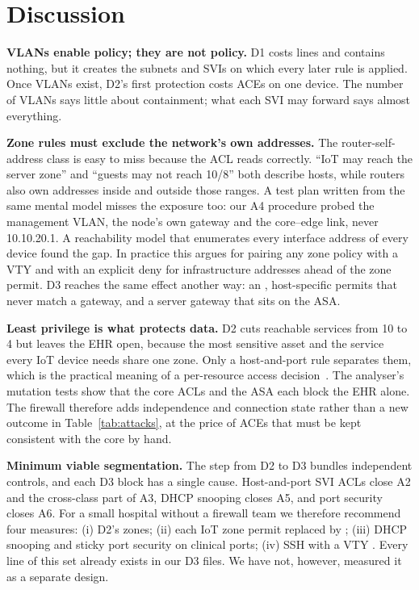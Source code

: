 \section{Discussion}
\label{sec:discussion}

\textbf{VLANs enable policy; they are not policy.}
D1 costs \deltaLinesDone{} lines and contains nothing, but it creates the subnets and SVIs on which every later rule is applied. Once VLANs exist, D2's first protection costs \deltaAcesDtwo{} ACEs on one device. The number of VLANs says little about containment; what each SVI may forward says almost everything.

\textbf{Zone rules must exclude the network's own addresses.}
The router-self-address class is easy to miss because the ACL reads correctly. ``IoT may reach the server zone'' and ``guests may not reach 10/8'' both describe hosts, while routers also own addresses inside and outside those ranges. A test plan written from the same mental model misses the exposure too: our A4 procedure probed the management VLAN, the node's own gateway and the core--edge link, never 10.10.20.1. A reachability model that enumerates every interface address of every device found the gap. In practice this argues for pairing any zone policy with a VTY  and with an explicit deny for infrastructure addresses ahead of the zone permit. D3 reaches the same effect another way: an , host-specific permits that never match a gateway, and a server gateway that sits on the ASA.

\textbf{Least privilege is what protects data.}
D2 cuts reachable services from 10 to 4 but leaves the EHR open, because the most sensitive asset and the service every IoT device needs share one zone. Only a host-and-port rule separates them, which is the practical meaning of a per-resource access decision~\cite{nist80027}. The analyser's mutation tests show that the core ACLs and the ASA each block the EHR alone. The firewall therefore adds independence and connection state rather than a new outcome in Table~\ref{tab:attacks}, at the price of \aceAsaDthree{} ACEs that must be kept consistent with the core by hand.

\textbf{Minimum viable segmentation.}
The step from D2 to D3 bundles independent controls, and each D3 block has a single cause. Host-and-port SVI ACLs close A2 and the cross-class part of A3, DHCP snooping closes A5, and port security closes A6. For a small hospital without a firewall team we therefore recommend four measures:
(i) D2's zones;
(ii) each IoT zone permit replaced by ;
(iii) DHCP snooping and sticky port security on clinical ports;
(iv) SSH with a VTY .
Every line of this set already exists in our D3 files. We have not, however, measured it as a separate design.

